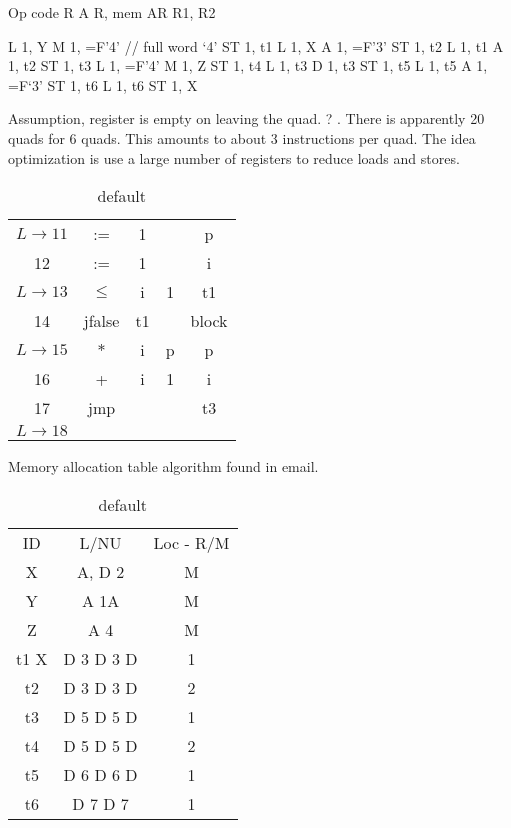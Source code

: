 \documentclass[11pt]{article}
\begin{document}
Op code R
A  R, mem
AR R1, R2

L 1, Y
M	1, =F'4'  // full word `4'
ST	1, t1
L	1, X
A	1, =F'3'
ST	1, t2
L	1, t1
A	1, t2
ST	1, t3
L	1, =F'4'
M 	1, Z
ST	1, t4
L	1, t3
D	1, t3
ST	1, t5
L	1, t5
A	1, =F`3'
ST	1, t6
L	1, t6
ST	1, X

Assumption, register is empty on leaving the quad.   ?  .  There is apparently 20 quads for 6 quads.  This amounts to about 3 instructions per quad.  The idea optimization is use a large number of registers to reduce loads and stores.  


\begin{table}[htdp]
\caption{default}
\begin{center}
\begin{tabular}{|c|c|c|c|c|}
$L \to 11 $& := & 1 & & p \\
12 & := & 1 & & i \\
$L \to 13$ & $\le$ & i & 1 & t1 \\
14 & jfalse & t1 & & block \\
$L \to 15$ & $\ast$ & i & p & p \\
16 & + & i & 1 & i \\
17 & jmp & & & t3 \\
$L \to 18$ &  & & 
\end{tabular}
\end{center}
\label{default}
\end{table}%

Memory allocation table algorithm found in email.

\begin{table}[htdp]
\caption{default}
\begin{center}
\begin{tabular}{|c|c|c|}
ID & L/NU & Loc - R/M \\
X & A, D 2 & M \\
Y & A 1A& M \\
Z & A 4 &  M  \\
t1 X & D 3 D 3 D & 1 \\
t2 & D  3 D 3  D & 2 \\
t3 & D 5 D 5 D& 1 \\
t4 & D 5 D 5 D& 2  \\
t5 & D 6 D  6 D & 1 \\
t6 & D 7 D 7 &  1 \\
\end{tabular}
\end{center}
\label{default}
\end{table}%
\end{document}
